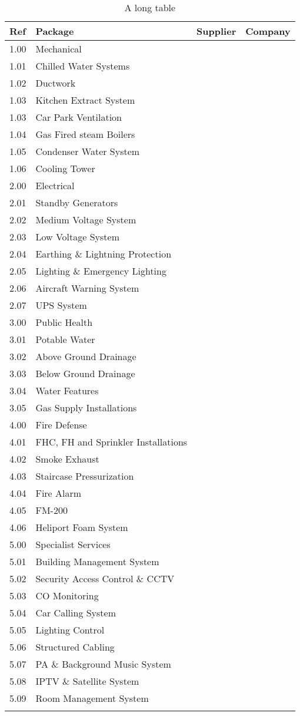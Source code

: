 
\label{chap:listofservices}

\begin{longtable}{llll}
\toprule
Ref	&Package	&Supplier	&Company\\
\midrule
1.00	&Mechanical	&	&\\
1.01	&Chilled Water Systems	&	&\\
1.02	&Ductwork  &		&\\
1.03    &Kitchen Extract System &&\\
1.03	&Car Park Ventilation 	&&\\
1.04	&Gas Fired steam Boilers &&		\\
1.05	&Condenser Water System 	&&     \\
1.06    &Cooling Tower &&  \\
\midrule
2.00	&Electrical		&&\\
2.01	&Standby Generators	&&\\	
2.02	&Medium Voltage System	&&\\	
2.03	&Low Voltage System		&&\\
2.04	&Earthing \& Lightning Protection &&\\		
2.05	&Lighting \& Emergency Lighting  &&\\		
2.06	&Aircraft Warning System &&\\		
2.07	&UPS System	&&\\	
\midrule
3.00	&Public Health		&&\\
3.01	&Potable Water	&&\\	
3.02	&Above Ground Drainage &&\\		
3.03	&Below Ground Drainage  &&\\		
3.04	&Water Features	     &&\\	
3.05	&Gas Supply Installations	&&\\	
\midrule		
4.00	&Fire Defense &&\\	
4.01	&FHC, FH and Sprinkler Installations	&&\\	
4.02	&Smoke Exhaust		&&\\
4.03	&Staircase Pressurization          &&\\		
4.04	&Fire Alarm		&&\\
4.05	&FM-200		&&\\
4.06	&Heliport Foam System	 &&\\	
\midrule
5.00	&Specialist Services		&&\\
5.01	&Building Management System	&&\\	
5.02	&Security Access Control \& CCTV	&&\\	
5.03	&CO Monitoring		&&\\
5.04	&Car Calling System		&&\\
5.05	&Lighting Control		&&\\
5.06	&Structured Cabling		&&\\
5.07	&PA \& Background Music System &&\\		
5.08	&IPTV \& Satellite System	&&\\	
5.09	&Room Management System	&&\\
\bottomrule
\caption{A long table}
\end{longtable}

